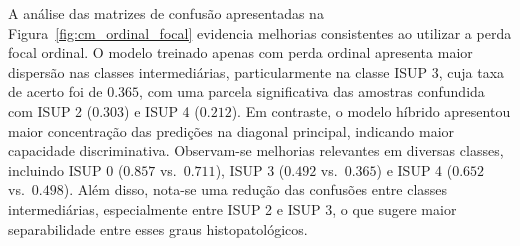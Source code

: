 \begin{table}[!htb]
	\centering
	\caption{Impacto incremental das estratégias propostas no desempenho da EfficientNet-B0.}
	\label{tab:impacto_loss_expandido}
\end{table}

A análise das matrizes de confusão apresentadas na Figura~\ref{fig:cm_ordinal_focal} evidencia melhorias consistentes ao utilizar a perda focal ordinal. O modelo treinado apenas com perda ordinal apresenta maior dispersão nas classes intermediárias, particularmente na classe ISUP 3, cuja taxa de acerto foi de $0.365$, com uma parcela significativa das amostras confundida com ISUP 2 ($0.303$) e ISUP 4 ($0.212$). Em contraste, o modelo híbrido apresentou maior concentração das predições na diagonal principal, indicando maior capacidade discriminativa. Observam-se melhorias relevantes em diversas classes, incluindo ISUP 0 ($0.857$ vs.\ $0.711$), ISUP 3 ($0.492$ vs.\ $0.365$) e ISUP 4 ($0.652$ vs.\ $0.498$). Além disso, nota-se uma redução das confusões entre classes intermediárias, especialmente entre ISUP 2 e ISUP 3, o que sugere maior separabilidade entre esses graus histopatológicos.

